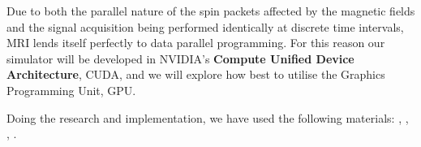 


Due to both the parallel nature of the spin packets affected by the
magnetic fields and the signal acquisition being performed identically
at discrete time intervals, MRI lends itself perfectly to data parallel
programming. For this reason our simulator will be developed in
NVIDIA's \textbf{Compute Unified Device Architecture}, CUDA, and we
will explore how best to utilise the Graphics Programming Unit, GPU.


Doing the research and implementation, we have used the following
materials: \cite{HaackeBook99}, \cite{feeman}, \cite{aibinu-mri}, \cite{benoit2005simri}.


